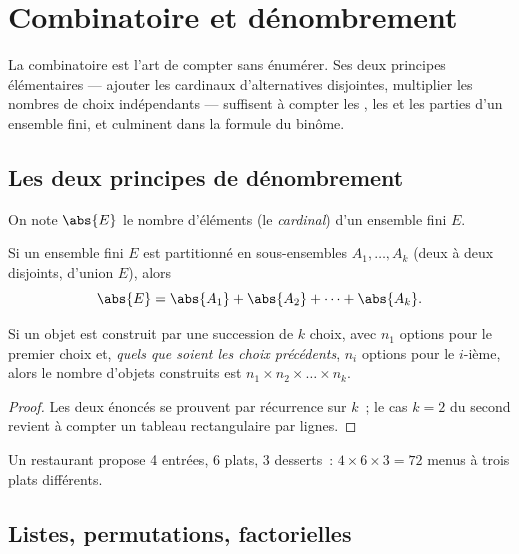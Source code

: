 \chapter{Combinatoire et dénombrement}\label{ch:g12:comb}

La combinatoire est l'art de compter sans énumérer. Ses deux principes
élémentaires --- ajouter les cardinaux d'alternatives disjointes, multiplier
les nombres de choix indépendants --- suffisent à compter les ,
les  et les parties d'un ensemble fini, et culminent dans la
formule du binôme.

\section{Les deux principes de dénombrement}

On note $\abs{E}$ le nombre d'éléments (le \emph{cardinal}) d'un ensemble
fini $E$.

\begin{proposition}\label{prop:g12:comb:addition}
Si un ensemble fini $E$ est partitionné en sous-ensembles
$A_1, \dots, A_k$ (deux à deux disjoints, d'union $E$), alors
\[
\abs{E} = \abs{A_1} + \abs{A_2} + \dots + \abs{A_k}.
\]
\end{proposition}

\begin{proposition}\label{prop:g12:comb:multiplication}
Si un objet est construit par une succession de $k$ choix, avec $n_1$
options pour le premier choix et, \emph{quels que soient les choix
précédents}, $n_i$ options pour le $i$-ième, alors le nombre d'objets
construits est $n_1 \times n_2 \times \dots \times n_k$.
\end{proposition}

\begin{proof}
Les deux énoncés se prouvent par récurrence sur $k$~; le cas $k = 2$ du
second revient à compter un tableau rectangulaire par lignes.
\end{proof}

\begin{example}
Un restaurant propose 4 entrées, 6 plats, 3 desserts~: $4 \times 6 \times 3
= 72$ menus à trois plats différents.
\end{example}

\section{Listes, permutations, factorielles}

